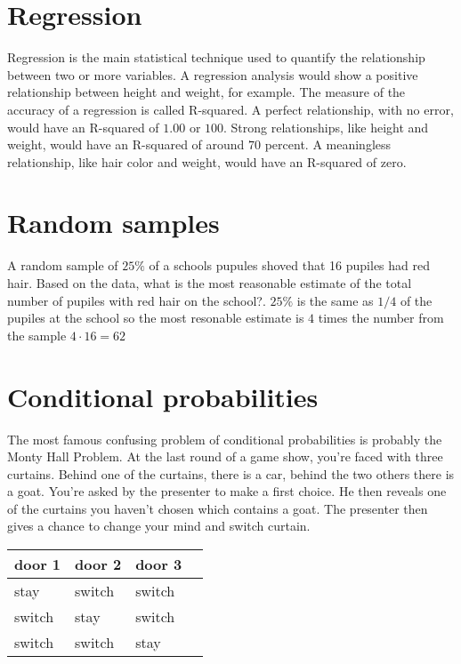 \section{Regression}
Regression is the main statistical technique used to quantify the relationship between two or more variables. A regression analysis would show a positive relationship between height and weight, for example. The measure of the accuracy of a regression is called R-squared. A perfect relationship, with no error, would have an R-squared of $1.00$ or $100$. Strong relationships, like height and weight, would have an R-squared of around $70$ percent. A meaningless relationship, like hair color and weight, would have an R-squared of zero.

\section{Random samples}
A random sample of $25\%$ of a schools pupules shoved that 16 pupiles had red hair. Based on the data, what is the most reasonable estimate of the total number of pupiles with red hair on the school?. $25\%$ is the same as $1/4$ of the pupiles at the school so the most resonable estimate is $4$ times the number from the sample $4 \cdot 16 = 62$

\section{Conditional probabilities}
The most famous confusing problem of conditional probabilities is probably the Monty Hall Problem. At the last round of a game show, you’re faced with three curtains. Behind one of the curtains, there is a car, behind the two others there is a goat. You’re asked by the presenter to make a first choice. He then reveals one of the curtains you haven’t chosen which contains a goat. The presenter then gives a chance to change your mind and switch curtain.

\begin{table}[htb!]
\begin{tabular}{|l|l|l|l|}
\hline
\textbf{door 1} & \textbf{door 2} & \textbf{door 3} \\ \hline
stay            & switch          & switch          \\ \hline
switch          & stay            & switch          \\ \hline
switch          & switch          & stay            \\ \hline
\end{tabular}
\end{table}

